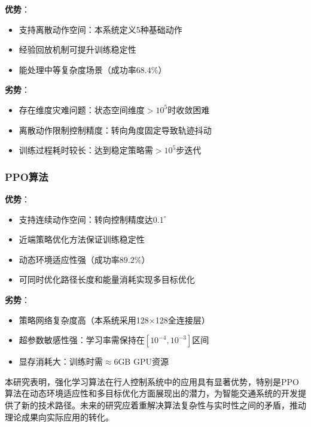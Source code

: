 \textbf{优势}：
\begin{itemize}
  \item 支持离散动作空间：本系统定义5种基础动作
  \item 经验回放机制可提升训练稳定性
  \item 能处理中等复杂度场景（成功率$68.4\%$）
\end{itemize}

\textbf{劣势}：
\begin{itemize}
  \item 存在维度灾难问题：状态空间维度$>10^5$时收敛困难
  \item 离散动作限制控制精度：转向角度固定导致轨迹抖动
  \item 训练过程耗时较长：达到稳定策略需$>10^5$步迭代
\end{itemize}

\subsubsection{PPO算法}
\label{subsubsec:ppo_analysis}

\textbf{优势}：
\begin{itemize}
  \item 支持连续动作空间：转向控制精度达$0.1^\circ$
  \item 近端策略优化方法保证训练稳定性
  \item 动态环境适应性强（成功率$89.2\%$）
  \item 可同时优化路径长度和能量消耗实现多目标优化
\end{itemize}

\textbf{劣势}：
\begin{itemize}
  \item 策略网络复杂度高（本系统采用128×128全连接层）
  \item 超参数敏感性强：学习率需保持在$[10^{-4},10^{-3}]$区间
  \item 显存消耗大：训练时需$≈6$GB GPU资源
\end{itemize}

本研究表明，强化学习算法在行人控制系统中的应用具有显著优势，特别是PPO算法在动态环境适应性和多目标优化方面展现出的潜力，为智能交通系统的开发提供了新的技术路径。未来的研究应着重解决算法复杂性与实时性之间的矛盾，推动理论成果向实际应用的转化。
